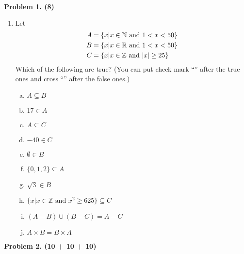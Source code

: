 \documentclass[12pt,twoside]{article}
\renewcommand{\baselinestretch}{1.2}
\begin{document}
\renewcommand{\baselinestretch}{1.2}
\normalsize
%
%
\newpage
{\bf Problem 1. (8)}
\begin{enumerate}
	\item
	Let
	\begin{align*}
		\centering
		A &= \{x|x \in \mathbb{N} \text{ and } 1 <x<50\}\\
		B &= \{x|x \in \mathbb{R} \text{ and } 1 <x<50\}\\
		C &= \{x|x \in \mathbb{Z} \text{ and } |x| \geq 25\}
	\end{align*}
	Which of the following are true? (You can put check mark ``'' after the true ones and cross ``'' after the false ones.)

	\begin{enumerate}[a.]
		\item
		$ A\subseteq B $ 

		\item
		$17 \in A$ 

		\item
		$A \subseteq C$ 

		\item
		$-40 \in C$ 

		\item
		$ \emptyset \in B$ 

		\item
		$ \{0,1,2\} \subseteq A$ 

		\item
		$\sqrt{3} \in B$ 

		\item
		$\{x|x \in \mathbb{Z} \text{ and } x^2 \geq 625\} \subseteq C$ 

		\item
		$(A -B) \cup (B - C) = A - C$ 
		\item
		$A \times B = B \times A$ 
	\end{enumerate}

	\vspace{0in}
\end{enumerate}
%
%
\newpage
{\bf Problem 2. (10 + 10 + 10)}
%
\end{document}
